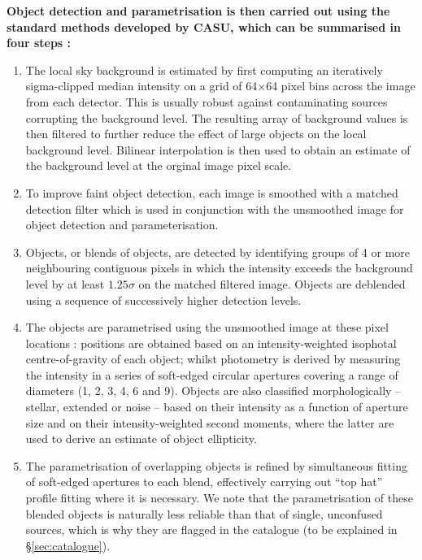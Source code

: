 \documentclass[a4paper,useAMS,usenatbib]{mn2e}
\begin{document}
{ \bf
Object detection and parametrisation is then carried out
using the standard methods developed by CASU,
which can be summarised in four steps
\citep[a discussion on each of these steps
and related points can be found in][]{Irwin1985,Irwin1997}:
\begin{enumerate}
\item The local sky background is estimated by first computing an iteratively
sigma-clipped median intensity on a grid of 64$\times$64 pixel bins across 
the image from each detector.  This is usually robust against contaminating 
sources corrupting the background level. The resulting array of background
values is then filtered to further reduce the effect of large objects on
the local background level. Bilinear interpolation is then used to obtain an 
estimate of the background level at the orginal image pixel scale.
\item To improve faint object detection, each image is smoothed with a matched
detection filter which is used in conjunction with the unsmoothed image
for object detection and parameterisation.
\item Objects, or blends of objects, are detected
by identifying groups of 4 or more neighbouring contiguous pixels
in which the intensity exceeds the background level by at least $1.25\sigma$
on the matched filtered image. Objects are deblended using a sequence of
successively higher detection levels.
\item The objects are parametrised using the unsmoothed image at these pixel 
locations : positions are obtained based on an intensity-weighted isophotal 
centre-of-gravity of each object; whilst photometry is derived by measuring 
the intensity in a series of soft-edged circular apertures covering a range 
of diameters (1, 2, 3, 4, 6 and 
9).  Objects are also classified morphologically
-- stellar, extended or noise -- based on their intensity as a function of 
aperture size and on their intensity-weighted second moments, where the latter
are used to derive an estimate of object ellipticity.
\item The parametrisation of overlapping objects is refined by simultaneous 
fitting of soft-edged apertures to each blend,
effectively carrying out ``top hat'' profile fitting where it is necessary.
We note that the parametrisation of these blended objects is naturally
less reliable than that of single, unconfused sources,
which is why they are flagged in the catalogue
(to be explained in \S\ref{sec:catalogue}).
\end{enumerate}

}
\end{document}
